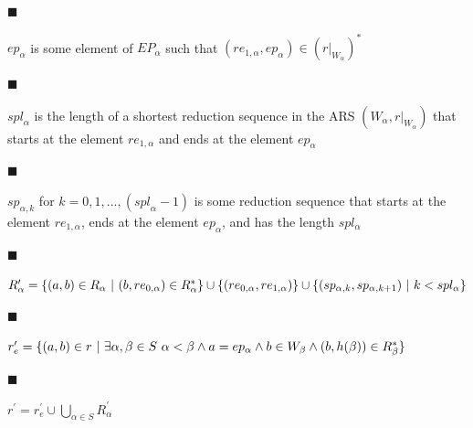  
 
\par\noindent  $\blacksquare$ 
 
$ep_{\alpha}$ is some element of $EP_{\alpha}$ such that $(re_{1,\alpha},ep_{\alpha})\in(r|_{W_{\alpha}})^{*}$\par
 
 
 
\par\noindent  $\blacksquare$ 
 
${spl}_{\alpha}$ is the length of a shortest reduction sequence in the ARS $(W_{\alpha},r|_{W_{\alpha}})$ that starts at the element ${re}_{1,\alpha}$ and ends at the element ${ep}_{\alpha}$\par
 
 
 
\par\noindent  $\blacksquare$ 
 
${sp}_{\alpha,k}$ for $k=0,1,...,({spl}_{\alpha}-1)$ is some reduction sequence that starts at the element ${re}_{1,\alpha}$, ends at the element ${ep}_{\alpha}$, and has the length $spl_{\alpha}$\par
 
 
 
\par\noindent  $\blacksquare$ 
 
$R^{\prime}_{\alpha}=\{(a,b)\in R_{\alpha}\leavevmode\nobreak\ |\leavevmode%
\nobreak\ (b,{re}_{0,\alpha})\in R_{\alpha}^{*}\}\cup\{({re}_{0,\alpha},re_{1,%
\alpha})\}\cup\{(sp_{\alpha,k},sp_{\alpha,k+1})\leavevmode\nobreak\ |%
\leavevmode\nobreak\ k<spl_{\alpha}\}$\par
 
 
 
\par\noindent  $\blacksquare$ 
 
$r_{e}^{\prime}=\{(a,b)\in r\leavevmode\nobreak\ |\leavevmode\nobreak\ \exists%
\alpha,\beta\in S\leavevmode\nobreak\ \alpha<\beta\wedge a=ep_{\alpha}\wedge b%
\in W_{\beta}\wedge(b,h(\beta))\in R_{\beta}^{*}\}$\par
 
 
 
\par\noindent  $\blacksquare$ 
 
$r^{\prime}=r_{e}^{\prime}\cup\bigcup_{\alpha\in S}R^{\prime}_{\alpha}$\par
 
